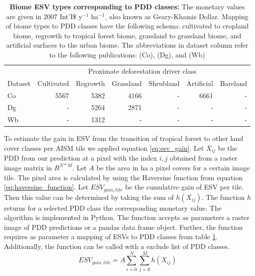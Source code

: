 		\begin{table}[ht]
			\centering
			\caption[Biome ESV types corresponding to PDD classes]{\textbf{Biome ESV types corresponding to PDD classes:} The monetary values are given in 2007 Int'I\$ y$^{-1}$ ha$^{-1}$, also known as Geary-Khamis Dollar. Mapping of biome types to PDD classes have the following schema: cultivated to cropland biome, regrowth to tropical forest biome, grassland to grassland biome, and artificial surfaces to the urban biome. The abbreviations in dataset column refer to the following publications: \citet{Costanza2014} (Co), \citet{Groot2012} (Dg), and \citet{Siikamaki2015} (Wb)}
			\label{tab:esv_mapping}
			\begin{tabular}{lrrrrrr}
				\hline
				& \multicolumn{6}{c}{Proximate deforestation driver class} \\\cline{2-7}
				Dataset & Cultivated & Regrowth & Grassland & Shrubland &  Artificial & Bareland \\
				\hline
				Co & 5567 & 5382 & 4166 & - & 6661 & - \\
				Dg & - & 5264 & 2871 & - & - & - \\
				Wb & - & 1312 & - & - & - & - \\
				\hline
			\end{tabular}
		\end{table}
		To estimate the gain in \ac{ESV} from the transition of tropical forest to other land cover classes per \ac{AISM} tile we applied equation \ref{eq:esv_gain}. Let $X_{ij}$ be the \ac{PDD} from our prediction at a pixel with the index $i,j$ obtained from a raster image matrix in $R^{N*M}$. Let $A$ be the area in ha a pixel covers for a certain image tile. The pixel area is calculated by using the Haversine function from equation \ref{eq:haversine_function}. Let $ESV_{gain,tile}$ be the cumulative gain of \ac{ESV} per tile. Then this value can be determined by taking the sum of $h(X_{ij})$. The function $h$ returns for a selected \ac{PDD} class the corresponding monetary value. The algorithm is implemented in Python. The function accepts as parameters a raster image of \ac{PDD} predictions or a pandas data frame object. Further, the function requires as parameter a mapping of \acp{ESV} to \ac{PDD} classes from table \ref{tab:esv_mapping}. Additionally, the function can be called with a exclude list of \ac{PDD} classes.
		\begin{equation}
		\label{eq:esv_gain}
			ESV_{gain,tile} = A\displaystyle\sum_{i=0}^{N}\displaystyle\sum_{j=0}^{M} h(X_{ij})
		\end{equation}
